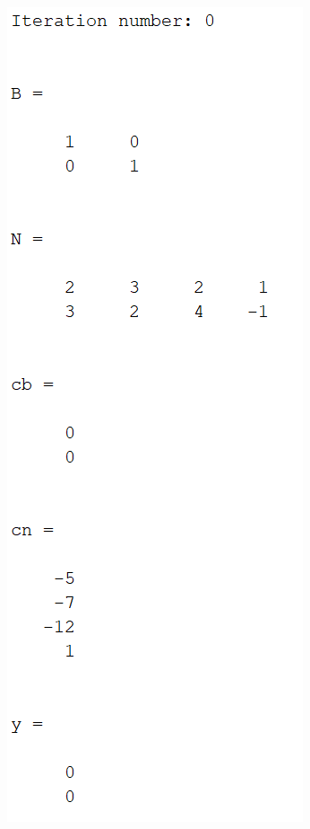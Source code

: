 \documentclass{article}
\begin{document}
\begin{itemize}
    \begin{center}
        \includegraphics[scale = 0.7]{2_2_i_iter0}

\end{center}
\end{itemize}
\end{document}
